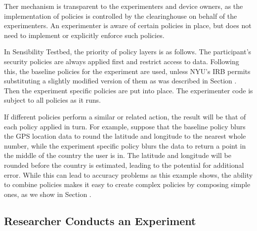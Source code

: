 Ther mechanism is transparent to the experimenters 
and device owners, as the implementation of policies is controlled by the 
clearinghouse on behalf of the experimenters. An experimenter is aware 
of certain policies in place, but does not need to implement or explicitly
enforce such policies. 

In Sensibility Testbed, the priority of policy layers is as follows.  
The participant's security policies are always applied first and restrict
access to data.  Following this, the baseline policies for the experiment
are used, unless NYU's IRB permits substituting a slightly modified version
of them as was described in Section .  Then the experiment specific
policies are put into place.  The experimenter code is subject to all
policies as it runs.

If different policies perform a similar or related action, the result will
be that of each policy applied in turn.  For example, suppose that the
baseline policy blurs the GPS location data to round the latitude and longitude
to the nearest whole number, while the experiment specific policy blurs the
data to return a point in the middle of the country the user is in.  
The latitude and longitude will be rounded before the country is estimated, 
leading to the potential for additional error.  While this can lead to 
accuracy problems as this example shows, the ability to combine policies
makes it easy to create complex policies by composing simple ones,
as we show in Section .


\subsection{Researcher Conducts an Experiment}\label{sec-emt}

